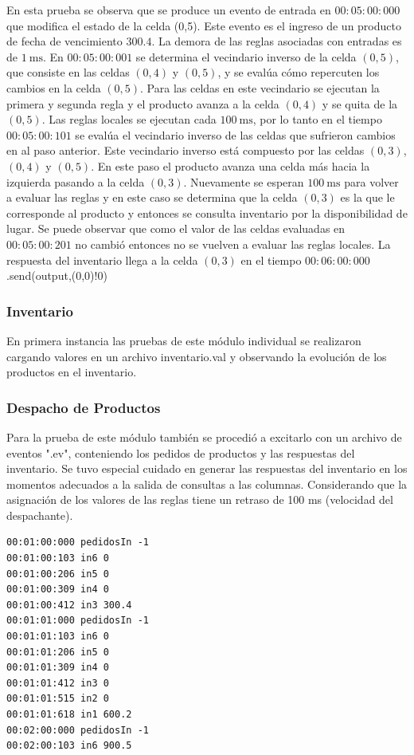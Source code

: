 \documentclass[10pt]{article}
\begin{document}
En esta prueba se observa que se produce un evento de entrada en $00:05:00:000$ que modifica el estado de la celda (0,5). Este evento es el ingreso de un producto de fecha de vencimiento $300.4$. La demora de las reglas asociadas con entradas es de $1~\textrm{ms}$. En $00:05:00:001$ se determina el vecindario inverso de la celda $(0,5)$, que consiste en las celdas $(0,4)$ y $(0,5)$, y se evalúa cómo repercuten los cambios en la celda $(0,5)$. Para las celdas en este vecindario se ejecutan la primera y segunda regla y el producto avanza a la celda $(0,4)$ y se quita de la $(0,5)$. Las reglas locales se ejecutan cada $100~\textrm{ms}$, por lo tanto en el tiempo $00:05:00:101$ se evalúa el vecindario inverso de las celdas que sufrieron cambios en al paso anterior. Este vecindario inverso está compuesto por las celdas $(0,3)$, $(0,4)$ y $(0,5)$. En este paso el producto avanza una celda más hacia la izquierda pasando a la celda $(0,3)$. Nuevamente se esperan $100~\textrm{ms}$ para volver a evaluar las reglas y en este caso se determina que la celda $(0,3)$ es la que le corresponde al producto y entonces se consulta inventario por la disponibilidad de lugar. Se puede observar que como el valor de las celdas evaluadas en $00:05:00:201$ no cambió entonces no se vuelven a evaluar las reglas locales. La respuesta del inventario llega a la celda $(0,3)$ en el tiempo $00:06:00:000$.send(output,(0,0)!0)

\subsubsection{Inventario}
En primera instancia las pruebas de este módulo individual se realizaron cargando valores en un archivo inventario.val y observando la evolución de los productos en el inventario.
\subsubsection{Despacho de Productos}
Para la prueba de este módulo también se procedió a excitarlo con un archivo de eventos ".ev", conteniendo los pedidos de productos y las respuestas del inventario. Se tuvo especial cuidado en generar las respuestas del inventario en los momentos adecuados a la salida de consultas a las columnas. Considerando que la asignación de los valores de las reglas tiene un retraso de 100 ms (velocidad del despachante).

\begin{minipage}{1\textwidth}
	\centering
	\begin{lstlisting}
00:01:00:000 pedidosIn -1
00:01:00:103 in6 0
00:01:00:206 in5 0
00:01:00:309 in4 0
00:01:00:412 in3 300.4
00:01:01:000 pedidosIn -1
00:01:01:103 in6 0
00:01:01:206 in5 0
00:01:01:309 in4 0
00:01:01:412 in3 0
00:01:01:515 in2 0
00:01:01:618 in1 600.2
00:02:00:000 pedidosIn -1
00:02:00:103 in6 900.5
	\end{lstlisting}	
\end{minipage}
\end{document}
